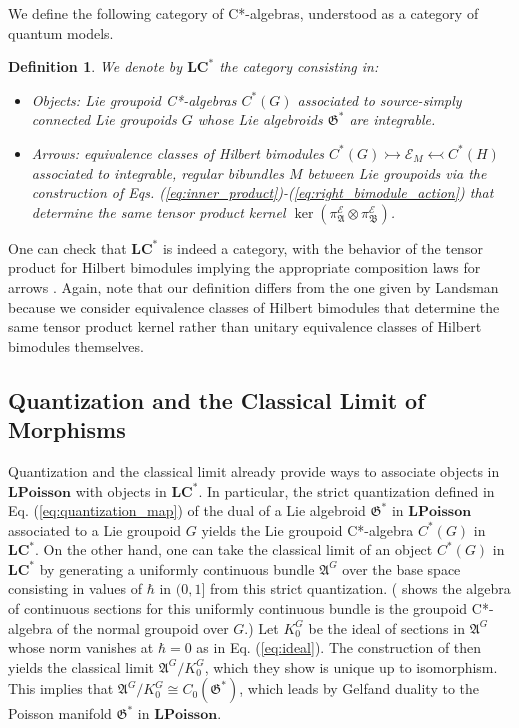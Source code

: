 \documentclass[sn-mathphys,Numbered]{sn-jnl}
\newtheorem{definition}{Definition}%
\begin{document}
We define the following category of C*-algebras, understood as a category of quantum models.\bigskip

\begin{definition}
    We denote by $\mathbf{LC^*}$ the category consisting in:
    \begin{itemize}
        \item \emph{Objects}: Lie groupoid C*-algebras $C^*(G)$ associated to source-simply connected Lie groupoids $G$ whose Lie algebroids $\mathfrak{G}^*$ are integrable.
        \item \emph{Arrows}: equivalence classes of Hilbert bimodules $C^*(G)\rightarrowtail \mathcal{E}_M\leftarrowtail C^*(H)$ associated to integrable, regular bibundles $M$ between Lie groupoids via the construction of Eqs. (\ref{eq:inner_product})-(\ref{eq:right_bimodule_action}) that determine the same tensor product kernel $\ker(\pi_\mathfrak{A}^\mathcal{E}\otimes\pi_\mathfrak{B}^\mathcal{E})$.
    \end{itemize}
\end{definition}
\noindent One can check that $\mathbf{LC^*}$ is indeed a category, with the behavior of the tensor product for Hilbert bimodules implying the appropriate composition laws for arrows \citep{La01b,La01c}.  Again, note that our definition differs from the one given by Landsman because we consider equivalence classes of Hilbert bimodules that determine the same tensor product kernel rather than unitary equivalence classes of Hilbert bimodules themselves. 

\subsection{Quantization and the Classical Limit of Morphisms}

Quantization and the classical limit already provide ways to associate objects in $\mathbf{LPoisson}$ with objects in $\mathbf{LC^*}$.  In particular, the strict quantization defined in Eq. (\ref{eq:quantization_map}) of the dual of a Lie algebroid $\mathfrak{G}^*$ in $\mathbf{LPoisson}$ associated to a Lie groupoid $G$ yields the Lie groupoid C*-algebra $C^*(G)$ in $\mathbf{LC^*}$.  On the other hand, one can take the classical limit of an object $C^*(G)$ in $\mathbf{LC^*}$ by generating a uniformly continuous bundle $\mathfrak{A}^G$ over the base space consisting in values of $\hbar$ in $(0,1]$ from this strict quantization. (\citet{La99} shows the algebra of continuous sections for this uniformly continuous bundle is the groupoid C*-algebra of the normal groupoid over $G$.)  Let $K^G_0$ be the ideal of sections in $\mathfrak{A}^G$ whose norm vanishes at $\hbar = 0$ as in Eq. (\ref{eq:ideal}).  The construction of \citet{StFe21a} then yields the classical limit $\mathfrak{A}^G/K^G_0$, which they show is unique up to isomorphism.  This implies that $\mathfrak{A}^G/K^G_0\cong C_0(\mathfrak{G}^*)$, which leads by Gelfand duality to the Poisson manifold $\mathfrak{G}^*$ in $\mathbf{LPoisson}$.
\end{document}
